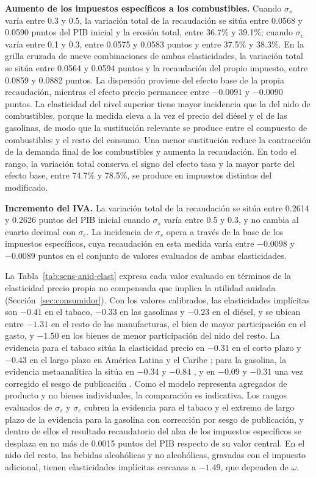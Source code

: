 \documentclass[11pt]{article}
\begin{document}
\textbf{Aumento de los impuestos específicos a los combustibles.} Cuando $\sigma_{s}$ varía entre 0.3 y 0.5, la variación total de la recaudación se sitúa entre 0.0568 y 0.0590 puntos del PIB inicial y la erosión total, entre 36.7\% y 39.1\%; cuando $\sigma_{c}$ varía entre 0.1 y 0.3, entre 0.0575 y 0.0583 puntos y entre 37.5\% y 38.3\%. En la grilla cruzada de nueve combinaciones de ambas elasticidades, la variación total se sitúa entre 0.0564 y 0.0594 puntos y la recaudación del propio impuesto, entre 0.0859 y 0.0882 puntos. La dispersión proviene del efecto base de la propia recaudación, mientras el efecto precio permanece entre $-0.0091$ y $-0.0090$ puntos. La elasticidad del nivel superior tiene mayor incidencia que la del nido de combustibles, porque la medida eleva a la vez el precio del diésel y el de las gasolinas, de modo que la sustitución relevante se produce entre el compuesto de combustibles y el resto del consumo. Una menor sustitución reduce la contracción de la demanda final de los combustibles y aumenta la recaudación. En todo el rango, la variación total conserva el signo del efecto tasa y la mayor parte del efecto base, entre 74.7\% y 78.5\%, se produce en impuestos distintos del modificado.

\textbf{Incremento del IVA.} La variación total de la recaudación se sitúa entre 0.2614 y 0.2626 puntos del PIB inicial cuando $\sigma_{s}$ varía entre 0.5 y 0.3, y no cambia al cuarto decimal con $\sigma_{c}$. La incidencia de $\sigma_{s}$ opera a través de la base de los impuestos específicos, cuya recaudación en esta medida varía entre $-0.0098$ y $-0.0089$ puntos en el conjunto de valores evaluados de ambas elasticidades.

La Tabla~\ref{tab:sens-anid-elast} expresa cada valor evaluado en términos de la elasticidad precio propia no compensada que implica la utilidad anidada (Sección~\ref{sec:consumidor}). Con los valores calibrados, las elasticidades implícitas son $-0.41$ en el tabaco, $-0.33$ en las gasolinas y $-0.23$ en el diésel, y se ubican entre $-1.31$ en el resto de las manufacturas, el bien de mayor participación en el gasto, y $-1.50$ en los bienes de menor participación del nido del resto. La evidencia para el tabaco sitúa la elasticidad precio en $-0.31$ en el corto plazo y $-0.43$ en el largo plazo en América Latina y el Caribe \cite{guindon_etal_2016}; para la gasolina, la evidencia metaanalítica la sitúa en $-0.34$ y $-0.84$ \cite{brons_etal_2008}, y en $-0.09$ y $-0.31$ una vez corregido el sesgo de publicación \cite{havranek_etal_2012}. Como el modelo representa agregados de producto y no bienes individuales, la comparación es indicativa. Los rangos evaluados de $\sigma_{s}$ y $\sigma_{c}$ cubren la evidencia para el tabaco y el extremo de largo plazo de la evidencia para la gasolina con corrección por sesgo de publicación, y dentro de ellos el resultado recaudatorio del alza de los impuestos específicos se desplaza en no más de 0.0015 puntos del PIB respecto de su valor central. En el nido del resto, las bebidas alcohólicas y no alcohólicas, gravadas con el impuesto adicional, tienen elasticidades implícitas cercanas a $-1.49$, que dependen de $\omega$.
\end{document}
